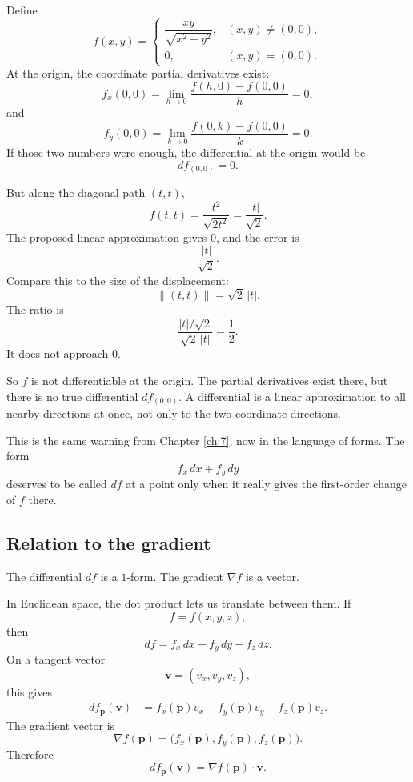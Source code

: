 \begin{example}
Define
\[
    f(x,y)=
    \begin{cases}
    \dfrac{xy}{\sqrt{x^2+y^2}}, & (x,y)\ne(0,0),\\[2mm]
    0, & (x,y)=(0,0).
    \end{cases}
\]
At the origin, the coordinate partial derivatives exist:
\[
    f_x(0,0)
    =
    \lim_{h\to0}\frac{f(h,0)-f(0,0)}{h}
    =
    0,
\]
and
\[
    f_y(0,0)
    =
    \lim_{k\to0}\frac{f(0,k)-f(0,0)}{k}
    =
    0.
\]
If those two numbers were enough, the differential at the origin would be
\[
    df_{(0,0)}=0.
\]

But along the diagonal path \((t,t)\),
\[
    f(t,t)=\frac{t^2}{\sqrt{2t^2}}=\frac{|t|}{\sqrt2}.
\]
The proposed linear approximation gives \(0\), and the error is
\[
    \frac{|t|}{\sqrt2}.
\]
Compare this to the size of the displacement:
\[
    \|(t,t)\|=\sqrt2\,|t|.
\]
The ratio is
\[
    \frac{|t|/\sqrt2}{\sqrt2\,|t|}=\frac12.
\]
It does not approach \(0\).

So \(f\) is not differentiable at the origin.  The partial derivatives exist there, but
there is no true differential \(df_{(0,0)}\).  A differential is a linear approximation to
all nearby directions at once, not only to the two coordinate directions.
\end{example}

This is the same warning from Chapter \ref{ch:7}, now in the language of forms.  The
form
\[
    f_x\,dx+f_y\,dy
\]
deserves to be called \(df\) at a point only when it really gives the first-order change of
\(f\) there.

\subsection{Relation to the gradient}

The differential \(df\) is a \(1\)-form.  The gradient \(\nabla f\) is a vector.

In Euclidean space, the dot product lets us translate between them.  If
\[
    f=f(x,y,z),
\]
then
\[
    df=f_x\,dx+f_y\,dy+f_z\,dz.
\]
On a tangent vector
\[
    \mathbf v=(v_x,v_y,v_z),
\]
this gives
\[
\begin{aligned}
    df_{\mathbf p}(\mathbf v)
    &=
    f_x(\mathbf p)v_x+f_y(\mathbf p)v_y+f_z(\mathbf p)v_z.
\end{aligned}
\]
The gradient vector is
\[
    \nabla f(\mathbf p)
    =
    \bigl(f_x(\mathbf p),f_y(\mathbf p),f_z(\mathbf p)\bigr).
\]
Therefore
\[
\boxed{
    df_{\mathbf p}(\mathbf v)
    =
    \nabla f(\mathbf p)\cdot \mathbf v.
}
\]

